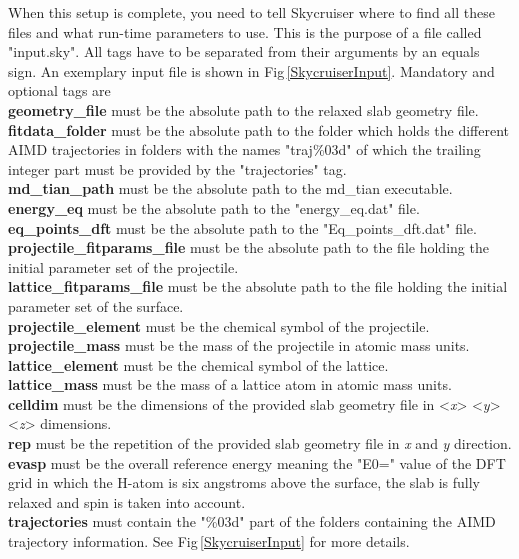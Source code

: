 \documentclass[twoside, 11pt, titlepage, captions=nooneline, a4paper, headsepline]{scrbook}%
\newcommand{\9}{\mathrm}
\newcommand{\0}{\,\mathrm}
\begin{document}
When this setup is complete, you need to tell Skycruiser where to find all these files and what run-time parameters to use. This is the purpose of a file called "input.sky". All tags have to be separated from their arguments by an equals sign. An exemplary input file is shown in Fig\,\ref{SkycruiserInput}. Mandatory and optional tags are \\
\textbf{geometry\_file} must be the absolute path to the relaxed slab geometry file.\\
\textbf{fitdata\_folder} must be the absolute path to the folder which holds the different AIMD trajectories in folders with the names "traj\%03d" of which the trailing integer part must be provided by the "trajectories" tag.\\
\textbf{md\_tian\_path} must be the absolute path to the md\_tian executable.\\
\textbf{energy\_eq} must be the absolute path to the "energy\_eq.dat" file.\\
\textbf{eq\_points\_dft} must be the absolute path to the "Eq\_points\_dft.dat" file.\\
\textbf{projectile\_fitparams\_file} must be the absolute path to the file holding the initial parameter set of the projectile.\\
\textbf{lattice\_fitparams\_file} must be the absolute path to the file holding the initial parameter set of the surface.\\
\textbf{projectile\_element} must be the chemical symbol of the projectile.\\
\textbf{projectile\_mass} must be the mass of the projectile in atomic mass units.\\
\textbf{lattice\_element} must be the chemical symbol of the lattice.\\
\textbf{lattice\_mass} must be the mass of a lattice atom in atomic mass units.\\
\textbf{celldim} must be the dimensions of the provided slab geometry file in <\textit{x}> <\textit{y}> <\textit{z}> dimensions.\\
\textbf{rep} must be the repetition of the provided slab geometry file in \textit{x} and \textit{y} direction.\\
\textbf{evasp} must be the overall reference energy meaning the "E0=" value of the DFT grid in which the H-atom is six angstroms above the surface, the slab is fully relaxed and spin is taken into account.\\ 
\textbf{trajectories} must contain the "\%03d" part of the folders containing the AIMD trajectory information. See Fig\,\ref{SkycruiserInput} for more details.\\
\end{document}
